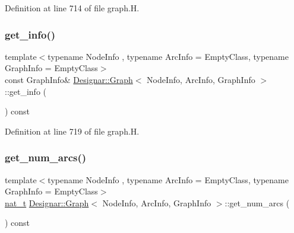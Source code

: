 Definition at line 714 of file graph.\+H.

\mbox{\label{class_designar_1_1_graph_adfbae301b6a211adaf1919bc41db176a}} 
\subsubsection{\texorpdfstring{get\+\_\+info()}{get\_info()}\hspace{0.1cm}{\footnotesize\ttfamily [2/2]}}
{\footnotesize\ttfamily template$<$typename Node\+Info , typename Arc\+Info  = Empty\+Class, typename Graph\+Info  = Empty\+Class$>$ \\
const Graph\+Info\& \hyperlink{class_designar_1_1_graph}{Designar\+::\+Graph}$<$ Node\+Info, Arc\+Info, Graph\+Info $>$\+::get\+\_\+info (\begin{DoxyParamCaption}{ }\end{DoxyParamCaption}) const\hspace{0.3cm}{\ttfamily [inline]}}



Definition at line 719 of file graph.\+H.

\mbox{\label{class_designar_1_1_graph_a5b155eda66a4c90f6a34b25c80d9342b}} 
\subsubsection{\texorpdfstring{get\+\_\+num\+\_\+arcs()}{get\_num\_arcs()}}
{\footnotesize\ttfamily template$<$typename Node\+Info , typename Arc\+Info  = Empty\+Class, typename Graph\+Info  = Empty\+Class$>$ \\
\hyperlink{namespace_designar_aa72662848b9f4815e7bf31a7cf3e33d1}{nat\+\_\+t} \hyperlink{class_designar_1_1_graph}{Designar\+::\+Graph}$<$ Node\+Info, Arc\+Info, Graph\+Info $>$\+::get\+\_\+num\+\_\+arcs (\begin{DoxyParamCaption}{ }\end{DoxyParamCaption}) const\hspace{0.3cm}{\ttfamily [inline]}}




